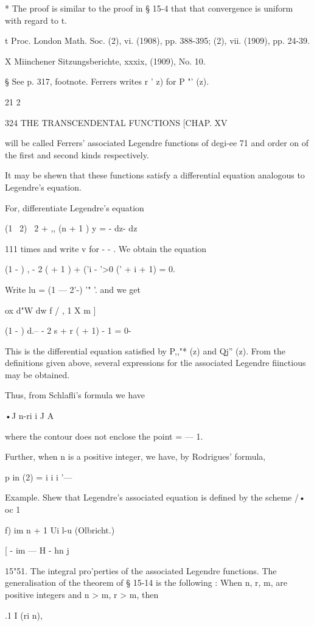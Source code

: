 {{{* The proof is similar to the proof in § 15-4 that that convergence is
uniform with regard to t.

t Proc. London Math. Soc. (2), vi. (1908), pp. 388-395; (2), vii.
(1909), pp. 24-39.

X Miinchener Sitzungsberichte, xxxix, (1909), No. 10.

§ See p. 317, footnote. Ferrers writes r ' z) for P "' (z).

21 2

324 THE TRANSCENDENTAL FUNCTIONS [CHAP. XV

will be called Ferrers' associated Legendre functions of degi-ee 71
and order on of the first and second kinds respectively.

It may be shewn that these functions satisfy a differential equation
analogous to Legendre's equation.

For, differentiate Legendre's equation

(1 \ 2) \ 2 + ,, (n + 1 ) y = - dz- dz

111 times and write v for - - . We obtain the equation

(1 - ) , - 2 ( + 1 ) + ('i - '>0 (' + i + 1) = 0.

Write lu = (1 — 2'-) '" '. and we get

ox d"W dw f / , 1 X m ]

(1 - ) d.-- - 2 s + r ( + 1) - 1 = 0-

This is the differential equation satisfied by P,,"* (z) and Qj'' (z).
From the definitions given above, several expressions for tlie
associated Legendre fiinctious may be obtained.

Thus, from Schlafli's formula we have

•J n-ri i J A

where the contour does not enclose the point = — 1.

Further, when n is a positive integer, we have, by Rodrigues' formula,

p in (2) = i i i '—

Example. Shew that Legendre's associated equation is defined by the
scheme /• oc 1

f) im n + 1 Ui l-u (Olbricht.)

[ - im — H - hn j

15"51. The integral pro'perties of the associated Legendre functions.
The generalisation of the theorem of § 15-14 is the following : When
n, r, m, are positive integers and n > m, r > m, then

.1 I (ri n),

}}}
